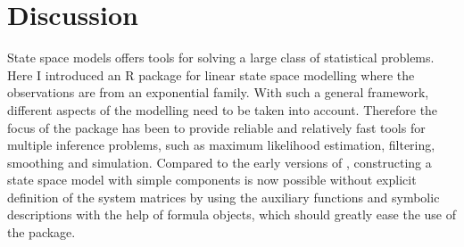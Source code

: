 \documentclass[nojss,article]{jss}\usepackage[]{graphicx}\usepackage[]{color}
\begin{document}
% 
% 
% 

\section{Discussion}

State space models offers tools for solving a large class of statistical problems. Here I introduced an R package  for linear state space modelling where the observations are from an exponential family. With such a general framework, different aspects of the modelling need to be taken into account. Therefore the focus of the package has been to provide reliable and relatively fast tools for multiple inference problems, such as maximum likelihood estimation, filtering, smoothing and simulation. Compared to the early versions of , constructing a state space model with simple components is now possible without explicit definition of the system matrices by using the auxiliary functions and symbolic descriptions with the help of formula objects, which should greatly ease the use of the package.
\end{document}
